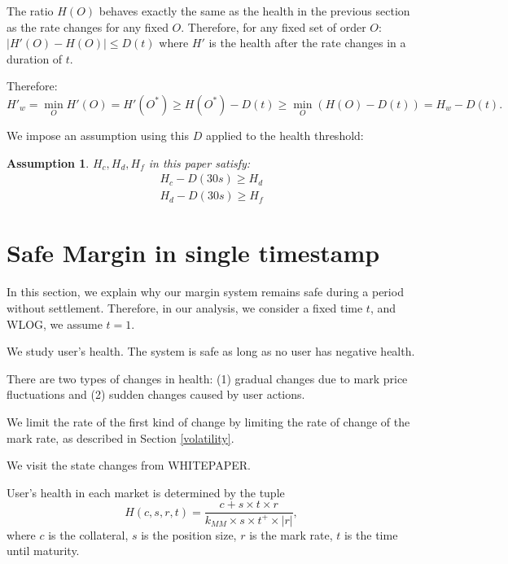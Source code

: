 \documentclass[notitlepage,reqno,11pt]{amsart}
\numberwithin{equation}{section}
\newtheorem{assumption}{Assumption}[section]
\begin{document}
The ratio $H(O)$ behaves exactly the same as the health in the previous section as the rate changes for any fixed $O$. Therefore, for any fixed set of order $O$:
$|H'(O) - H(O)| \leq D(t)$ where $H'$ is the health after the rate changes in a duration of $t$.

Therefore:
$$
H'_w = \min_O H'(O) = H'(O^*) \geq H(O^*) - D(t) \geq \min_O(H(O) - D(t)) = H_w - D(t).
$$

We impose an assumption using this $D$ applied to the health threshold:
\begin{assumption}
    $H_c, H_d, H_f$ in this paper satisfy:
    \begin{align}
        H_c - D(30s) \geq H_d\\
        H_d - D(30s) \geq H_f
    \end{align}
\end{assumption}


\section{Safe Margin in single timestamp}
In this section, we explain why our margin system remains safe during a period without settlement. Therefore, in our analysis, we consider a fixed time $t$, and WLOG, we assume $t=1$.

We study user's health. The system is safe as long as no user has negative health.

There are two types of changes in health: (1) gradual changes due to mark price fluctuations and (2) sudden changes caused by user actions.

We limit the rate of the first kind of change by limiting the rate of change of the mark rate, as described in Section \ref{volatility}.

We visit the state changes from WHITEPAPER.

User's health in each market is determined by the tuple 
\[H(c,s,r,t) = \frac{c + s\times t \times r}{k_{MM}\times s \times t^+ \times |r|},\] 
where $c$ is the collateral, $s$ is the position size, $r$ is the mark rate, $t$ is the time until maturity.
\end{document}
